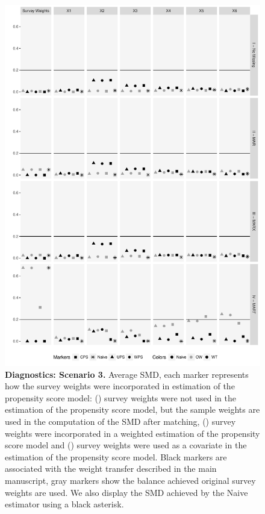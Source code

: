 \documentclass[oupdraft]{bio}
\newcommand{\mysquare}[1]{\tikz{\node[draw=#1,fill=#1,rectangle,minimum
width=0.18cm,minimum height=0.18cm,inner sep=0pt] at (0,0) {};}}
\newcommand{\mycircle}[1]{\tikz{\node[draw=#1,fill=#1,circle,minimum
width=0.2cm,minimum height=0.2cm,inner sep=0pt] at (0,0) {};}}
\newcommand{\mytriangle}[1]{\tikz{\node[draw=#1,fill=#1,isosceles
triangle,isosceles triangle stretches,shape border rotate=90,minimum
width=0.2cm,minimum height=0.2cm,inner sep=0pt] at (0,0) {};}}
\begin{document}
\begin{figure}[t]
\centering
\includegraphics[scale=0.63]{SMD_SC3_v2.pdf}
\caption{{\small{}\textbf{Diagnostics: Scenario 3.} Average SMD, each marker represents how the survey weights were incorporated in estimation of the propensity score model: (\mytriangle{black}) survey weights were not used in the estimation of the propensity score model, but the sample weights are used in the computation of the SMD after matching, (\mycircle{black}) survey weights were incorporated in a weighted estimation of the propensity score model and (\mysquare{black})  survey weights were used as a covariate in the estimation of the propensity score model. Black markers are associated with the weight transfer described in the main manuscript, gray markers show the balance achieved original survey weights are used. We also display the SMD achieved by the Naive estimator using a black asterisk.}}
\label{Diagnostics3} 
\end{figure}
\end{document}
